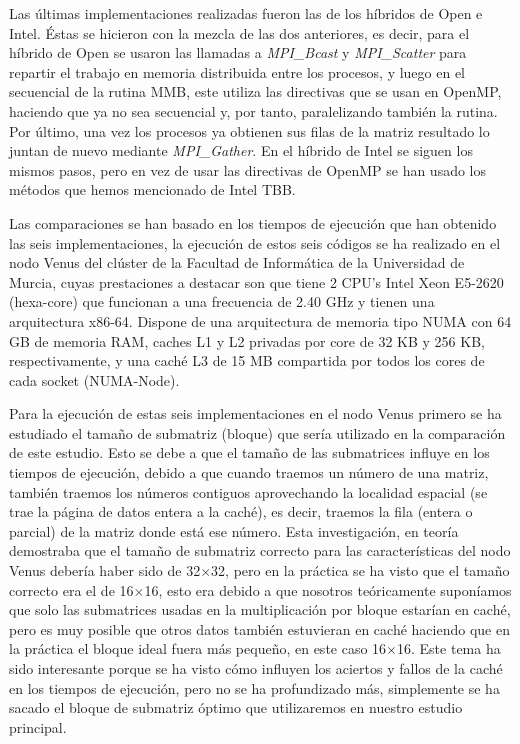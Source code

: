 \documentclass[a4paper,12pt]{article}
\begin{document}
Las últimas implementaciones realizadas fueron las de los híbridos de Open e Intel. Éstas se hicieron con la mezcla de las dos anteriores, es decir, para el híbrido de Open se usaron las llamadas a {\it MPI\_Bcast} y {\it MPI\_Scatter} para repartir el trabajo en memoria distribuida entre los procesos, y luego en el secuencial de la rutina MMB, este utiliza las directivas que se usan en OpenMP, haciendo que ya no sea secuencial y, por tanto, paralelizando también la rutina. Por último, una vez los procesos ya obtienen sus filas de la matriz resultado lo juntan de nuevo mediante {\it MPI\_Gather}. En el híbrido de Intel se siguen los mismos pasos, pero en vez de usar las directivas de OpenMP se han usado los métodos que hemos mencionado de Intel TBB.

Las comparaciones se han basado en los tiempos de ejecución que han obtenido las seis implementaciones, la ejecución de estos seis códigos se ha realizado en el nodo Venus del clúster de la Facultad de Informática de la Universidad de Murcia, cuyas prestaciones a destacar son que tiene 2 CPU's Intel Xeon E5-2620 (hexa-core) que funcionan a una frecuencia de 2.40 GHz y tienen una arquitectura x86-64. Dispone de una arquitectura de memoria tipo NUMA con 64 GB de memoria RAM, caches L1 y L2 privadas por core de 32 KB y 256 KB, respectivamente, y una caché L3 de 15 MB compartida por todos los cores de cada socket (NUMA-Node).

Para la ejecución de estas seis implementaciones en el nodo Venus primero se ha estudiado el tamaño de submatriz (bloque) que sería utilizado en la comparación de este estudio. Esto se debe a que el tamaño de las submatrices influye en los tiempos de ejecución, debido a que cuando traemos un número de una matriz, también traemos los números contiguos aprovechando la localidad espacial (se trae la página de datos entera a la caché), es decir, traemos la fila (entera o parcial) de la matriz donde está ese número. Esta investigación, en teoría demostraba que el tamaño de submatriz correcto para las características del nodo Venus debería haber sido de 32$\times$32, pero en la práctica se ha visto que el tamaño correcto era el de 16$\times$16, esto era debido a que nosotros teóricamente suponíamos que solo las submatrices usadas en la multiplicación por bloque estarían en caché, pero es muy posible que otros datos también estuvieran en caché haciendo que en la práctica el bloque ideal fuera más pequeño, en este caso 16$\times$16. Este tema ha sido interesante porque se ha visto cómo influyen los aciertos y fallos de la caché en los tiempos de ejecución, pero no se ha profundizado más, simplemente se ha sacado el bloque de submatriz óptimo que utilizaremos en nuestro estudio principal.
\end{document}
